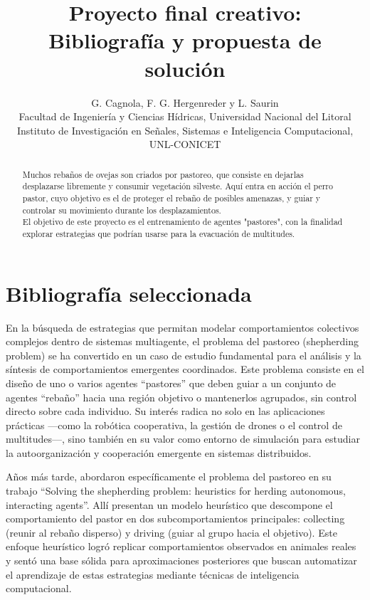 \documentclass[final]{article}
\begin{document}
\def\tablename{Tabla}          %

\title{Proyecto final creativo:\\
    Bibliografía y propuesta de solución}

\author{G. Cagnola, F. G. Hergenreder y L. Saurin \\
        Facultad de Ingeniería y Ciencias Hídricas,
        Universidad Nacional del Litoral \\
        Instituto de Investigación en Señales, Sistemas e Inteligencia Computacional, UNL-CONICET}

\maketitle

\begin{abstract}
Muchos rebaños de ovejas son criados por pastoreo, que consiste en dejarlas desplazarse libremente y consumir vegetación silveste.
Aquí entra en acción el perro pastor, cuyo objetivo es el de proteger el rebaño
de posibles amenazas, y guiar y controlar su movimiento durante los desplazamientos.\\
El objetivo de este proyecto es el entrenamiento de agentes "pastores", con la finalidad explorar estrategias que podrían usarse para la evacuación de multitudes.
\end{abstract}

\section{Bibliografía seleccionada}
En la búsqueda de estrategias que permitan modelar comportamientos colectivos complejos dentro de sistemas multiagente, el problema del pastoreo
(shepherding problem) se ha convertido en un caso de estudio fundamental para el análisis y la síntesis de comportamientos emergentes coordinados.
Este problema consiste en el diseño de uno o varios agentes “pastores” que deben guiar a un conjunto de agentes “rebaño” hacia una región objetivo
o mantenerlos agrupados, sin control directo sobre cada individuo. Su interés radica no solo en las aplicaciones prácticas —como la robótica cooperativa,
la gestión de drones o el control de multitudes—, sino también en su valor como entorno de simulación para estudiar la autoorganización y cooperación
emergente en sistemas distribuidos.

Años más tarde, \citet{Strombom} abordaron específicamente el problema del pastoreo en su trabajo “Solving the shepherding problem: heuristics
for herding autonomous, interacting agents”. Allí presentan un modelo heurístico que descompone el comportamiento del pastor en dos subcomportamientos
principales: collecting (reunir al rebaño disperso) y driving (guiar al grupo hacia el objetivo). Este enfoque heurístico logró replicar comportamientos
observados en animales reales y sentó una base sólida para aproximaciones posteriores que buscan automatizar el aprendizaje de estas estrategias mediante
técnicas de inteligencia computacional.
\end{document}
